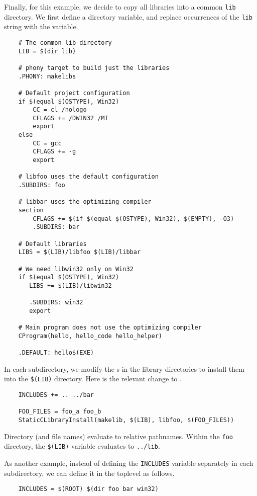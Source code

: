 Finally, for this example, we decide to copy all libraries into a common \verb+lib+ directory.  We
first define a directory variable, and replace occurrences of the \verb+lib+ string with the
variable.

\begin{verbatim}
    # The common lib directory
    LIB = $(dir lib)

    # phony target to build just the libraries
    .PHONY: makelibs

    # Default project configuration
    if $(equal $(OSTYPE), Win32)
        CC = cl /nologo
        CFLAGS += /DWIN32 /MT
        export
    else
        CC = gcc
        CFLAGS += -g
        export

    # libfoo uses the default configuration
    .SUBDIRS: foo

    # libbar uses the optimizing compiler
    section
        CFLAGS += $(if $(equal $(OSTYPE), Win32), $(EMPTY), -O3)
        .SUBDIRS: bar

    # Default libraries
    LIBS = $(LIB)/libfoo $(LIB)/libbar

    # We need libwin32 only on Win32
    if $(equal $(OSTYPE), Win32)
       LIBS += $(LIB)/libwin32

       .SUBDIRS: win32
       export

    # Main program does not use the optimizing compiler
    CProgram(hello, hello_code hello_helper)

    .DEFAULT: hello$(EXE)
\end{verbatim}

In each subdirectory, we modify the s in the library directories to install them
into the \verb+$(LIB)+ directory.  Here is the relevant change to .

\begin{verbatim}
    INCLUDES += .. ../bar

    FOO_FILES = foo_a foo_b
    StaticCLibraryInstall(makelib, $(LIB), libfoo, $(FOO_FILES))
\end{verbatim}

Directory (and file names) evaluate to relative pathnames.  Within the \verb+foo+ directory, the
\verb+$(LIB)+ variable evaluates to \verb+../lib+.

As another example, instead of defining the \verb+INCLUDES+ variable separately
in each subdirectory, we can define it in the toplevel as follows.

\begin{verbatim}
    INCLUDES = $(ROOT) $(dir foo bar win32)
\end{verbatim}

